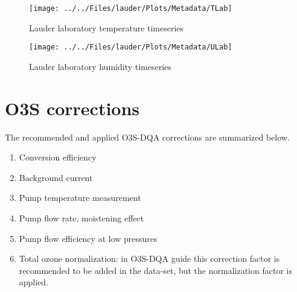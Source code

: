            \begin{figure}
        \centering
\texttt{[image: ../../Files/lauder/Plots/Metadata/TLab]}
    \caption{Lauder laboratory temperature timeseries}
            \label{fig:TLab}
    \end{figure}

               \begin{figure}
        \centering
\texttt{[image: ../../Files/lauder/Plots/Metadata/ULab]}
    \caption{Lauder laboratory humidity timeseries}
            \label{fig:ULab}
    \end{figure}


\section{O3S corrections}
\label{sec:v05}


The recommended and applied O3S-DQA corrections are summarized below.
    \begin{enumerate}
        \item Conversion efficiency
        \item Background current
        \item Pump temperature measurement
        \item Pump flow rate, moistening effect
        \item Pump flow efficiency at low pressures
        \item Total ozone normalization: in O3S-DQA guide this correction factor is recommended to be added in the data-set,
        but the normalization factor is applied.
\end{enumerate}


